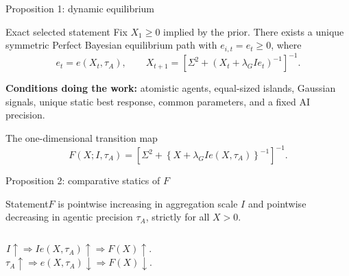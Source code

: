 \documentclass[aspectratio=169,10pt]{beamer}
\begin{document}
\begin{frame}{Proposition 1: dynamic equilibrium}
\small
\begin{block}{Exact selected statement}
Fix $X_1\ge0$ implied by the prior. There exists a unique symmetric Perfect Bayesian equilibrium path with $e_{i,t}=e_t\ge0$, where
\[
e_t=e(X_t,\tau_A),\qquad
X_{t+1}=\left[\Sigma^2+(X_t+\lambda_GIe_t)^{-1}\right]^{-1}.
\]
\end{block}
\textbf{Conditions doing the work:} atomistic agents, equal-sized islands, Gaussian signals, unique static best response, common parameters, and a fixed AI precision.
\end{frame}

\begin{frame}{The one-dimensional transition map}
\small
\[
F(X;I,\tau_A)=\left[\Sigma^2+\left\{X+\lambda_GIe(X,\tau_A)\right\}^{-1}\right]^{-1}.
\]
\begin{center}
\end{center}
\end{frame}

\begin{frame}{Proposition 2: comparative statics of $F$}
\small
\begin{block}{Statement}$F$ is pointwise increasing in aggregation scale $I$ and pointwise decreasing in agentic precision $\tau_A$, strictly for all $X>0$.\end{block}
\begin{columns}[T,onlytextwidth]
\[
I\uparrow\Rightarrow Ie(X,\tau_A)\uparrow\Rightarrow F(X)\uparrow.
\]
\[
\tau_A\uparrow\Rightarrow e(X,\tau_A)\downarrow\Rightarrow F(X)\downarrow.
\]
\end{columns}
\vspace{.25cm}
\end{frame}
\end{document}
